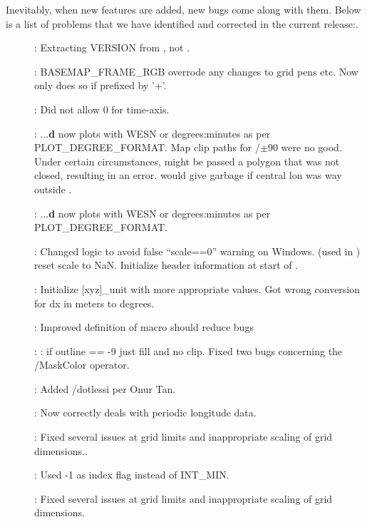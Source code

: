 Inevitably, when new features are added, new bugs come along with them.  Below is a list of problems
that we have identified and corrected in the current release:.

\begin{description}
\item []: Extracting VERSION from , not .
\item []: BASEMAP\_FRAME\_RGB overrode any changes to grid pens etc.  Now only
does so if prefixed by '+'.
\item []: Did not allow 0 for time-axis.
\item []: ...{\bf d} now plots with WESN or degrees:minutes as per PLOT\_DEGREE\_FORMAT.
Map clip paths for /$\pm 90$ were no good.  Under certain circumstances,  might be passed
a polygon that was not closed, resulting in an error.   would give garbage if central lon was way outside .
\item []: ...{\bf d} now plots with WESN or degrees:minutes as per PLOT\_DEGREE\_FORMAT.
\item []: Changed logic to avoid false ``scale==0'' warning on Windows.
 (used in ) reset scale to NaN.
Initialize header information at start of .
\item []: Initialize [xyz]\_unit with more appropriate values.
Got wrong conversion for dx in meters to degrees.
\item []: Improved definition of  macro should reduce bugs
\item []: : if outline == -9 just fill and no clip.
Fixed two bugs concerning the /MaskColor operator.
\item []: Added /dotlessi per Onur Tan.
\item []: Now correctly deals with periodic longitude data.
\item []: Fixed several issues at grid limits and inappropriate scaling of grid dimensions..
\item []: Used -1 as index flag instead of INT\_MIN.
\item []: Fixed several issues at grid limits and inappropriate scaling of grid dimensions.

\end{description}
